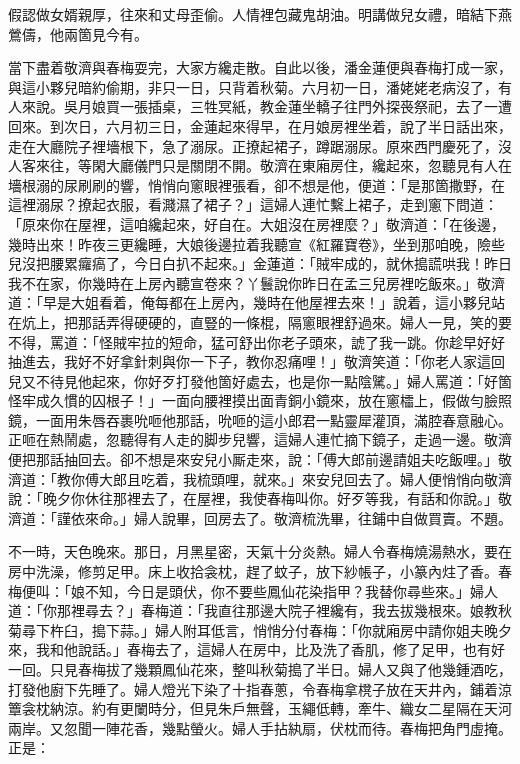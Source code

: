 \begin{myquote}
假認做女婿親厚，往來和丈母歪偷。人情裡包藏鬼胡油。明講做兒女禮，暗結下燕鶯儔，他兩箇見今有。
\end{myquote}

當下盡着敬濟與春梅耍完，大家方纔走散。自此以後，潘金蓮便與春梅打成一家，與這小夥兒暗約偷期，非只一日，只背着秋菊。六月初一日，潘姥姥老病沒了，有人來說。吳月娘買一張插桌，三牲冥紙，教金蓮坐轎子往門外探䘮祭祀，去了一遭回來。到次日，六月初三日，金蓮起來得早，在月娘房裡坐着，說了半日話出來，走在大廳院子裡墻根下，急了溺尿。正撩起裙子，蹲踞溺尿。原來西門慶死了，沒人客來往，等閑大廳儀門只是關閉不開。敬濟在東廂房住，纔起來，忽聽見有人在墻根溺的尿刷刷的響，悄悄向窻眼裡張看，卻不想是他，便道：「是那箇撒野，在這裡溺尿？撩起衣服，看濺濕了裙子？」這婦人連忙繫上裙子，走到窻下問道：「原來你在屋裡，這咱纔起來，好自在。大姐沒在房裡麼？」敬濟道：「在後邊，幾時出來！昨夜三更纔睡，大娘後邊拉着我聽宣《紅羅寶卷》，坐到那咱晚，險些兒沒把腰累㿚瘑了，今日白扒不起來。」{}金蓮道：「賊牢成的，就休搗謊哄我！昨日我不在家，你幾時在上房內聽宣卷來？丫鬟說你昨日在孟三兒房裡吃飯來。」{}敬濟道：「早是大姐看着，俺每都在上房內，幾時在他屋裡去來！」說着，這小夥兒站在炕上，把那話弄得硬硬的，直豎的一條棍，隔窻眼裡舒過來。{}婦人一見，笑的要不得，{}罵道：「怪賊牢拉的短命，猛可舒出你老子頭來，諕了我一跳。你趁早好好抽進去，我好不好拿針刺與你一下子，教你忍痛哩！」敬濟笑道：「你老人家這回兒又不待見他起來，你好歹打發他箇好處去，也是你一點陰騭。」{}婦人罵道：「好箇怪牢成久慣的囚根子！」一面向腰裡摸出面青銅小鏡來，放在窻櫺上，假做勻臉照鏡，一面用朱唇吞裹吮咂他那話，{}吮咂的這小郎君一點靈犀灌頂，滿腔春意融心。正咂在熱鬧處，忽聽得有人走的脚步兒響，這婦人連忙摘下鏡子，走過一邊。敬濟便把那話抽回去。卻不想是來安兒小厮走來，說：「傅大郎前邊請姐夫吃飯哩。」敬濟道：「教你傅大郎且吃着，我梳頭哩，就來。」來安兒回去了。婦人便悄悄向敬濟說：「晚夕你休往那裡去了，在屋裡，我使春梅叫你。好歹等我，有話和你說。」敬濟道：「謹依來命。」婦人說畢，回房去了。敬濟梳洗畢，往鋪中自做買賣。不題。

不一時，天色晚來。那日，月黑星密，天氣十分炎熱。婦人令春梅燒湯熱水，要在房中洗澡，修剪足甲。床上收拾衾枕，趕了蚊子，放下紗帳子，小篆內炷了香。春梅便叫：「娘不知，今日是頭伏，你不要些鳳仙花染指甲？我替你尋些來。」{}婦人道：「你那裡尋去？」春梅道：「我直往那邊大院子裡纔有，我去拔幾根來。娘教秋菊尋下杵臼，搗下蒜。」婦人附耳低言，悄悄分付春梅：「你就廂房中請你姐夫晚夕來，我和他說話。」春梅去了，這婦人在房中，比及洗了香肌，修了足甲，也有好一回。只見春梅拔了幾顆鳳仙花來，整叫秋菊搗了半日。婦人又與了他幾鍾酒吃，打發他廚下先睡了。婦人燈光下染了十指春蔥，令春梅拿櫈子放在天井內，鋪着涼簟衾枕納涼。約有更闌時分，但見朱戶無聲，玉繩低轉，牽牛、織女二星隔在天河兩岸。又忽聞一陣花香，幾點螢火。婦人手拈紈扇，伏枕而待。春梅把角門虛掩。正是：

